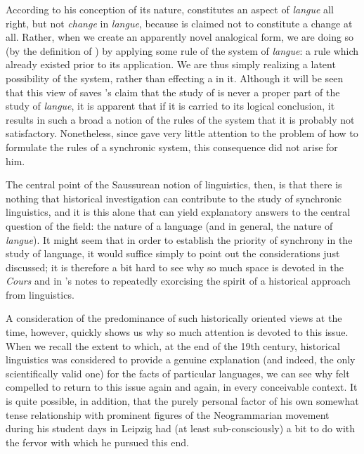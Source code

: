 According to his conception of its nature,  constitutes an
aspect of \emph{langue} all right, but not \emph{change} in
\emph{langue}, because  is claimed not to constitute a {change}
at all.  Rather, when we create an apparently novel analogical form,
we are doing so (by the definition of ) by applying some rule
of the system of \emph{langue}: a rule which already existed prior to
its application.  We are thus simply realizing a latent possibility of
the system, rather than effecting a  in it.  Although it will be
seen that this view of  saves {\Saussure}'s claim that the study
of  is never a proper part of the study of
\emph{langue}, it is apparent that if it is carried to its logical
conclusion, it results in such a broad a notion of the rules of the
system that it is probably not satisfactory.  Nonetheless, since
{\Saussure} gave very little attention to the problem of how to formulate
the {rules} of a synchronic system, this consequence did not arise for
him.

The central point of the Saussurean notion of linguistics, then, is
that there is nothing that historical investigation can contribute to
the study of synchronic linguistics, and it is this 
alone that can yield explanatory answers to the central question of
the field: the nature of a language (and in general, the nature of
\emph{langue}).  It might seem that in order to establish the priority
of synchrony in the study of language, it would suffice simply to
point out the considerations just discussed; it is therefore a bit
hard to see why so much space is devoted in the \textsl{Cours} and in
{\Saussure}'s notes to repeatedly exorcising the spirit of a historical
approach from linguistics.

A consideration of the predominance of such historically oriented
views at the time, however, quickly shows us why so much attention is
devoted to this issue.  When we recall the extent to which, at the end
of the 19th century, historical linguistics was considered to provide
a genuine {explanation} (and indeed, the only scientifically valid one)
for the facts of particular languages, we can see why {\Saussure} felt
compelled to return to this issue again and again, in every
conceivable context. It is quite possible, in addition, that the
purely personal factor of his own somewhat tense relationship with
prominent figures of the Neogrammarian movement during his student
days in {Leipzig} had (at least sub-consciously) a bit to do with the
fervor with which he pursued this end.

